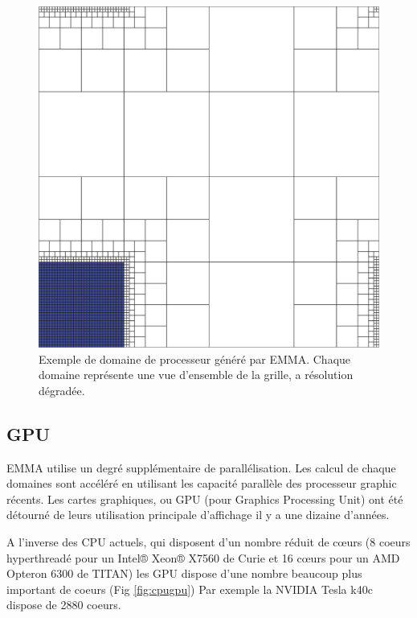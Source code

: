 \begin{figure}[bth]
        \includegraphics[width=.95\linewidth]{img/02/secteur.png} 
        \caption{Exemple de domaine de processeur généré par EMMA. 
        Chaque domaine représente une vue d'ensemble de la grille, a résolution dégradée.
}
 		\label{fig:hilbert2}
\end{figure}







\subsection{GPU}

EMMA utilise un degré supplémentaire de parallélisation.
Les calcul de chaque domaines sont accéléré en utilisant les capacité parallèle des processeur graphic récents.
Les cartes graphiques, ou GPU (pour Graphics Processing Unit) ont été détourné de leurs utilisation principale d'affichage il y a une dizaine d'années.

A l'inverse des CPU actuels, qui disposent d'un nombre réduit de cœurs (8 coeurs hyperthreadé pour un Intel® Xeon® X7560 de Curie et 16 cœurs pour un AMD Opteron 6300 de TITAN) les GPU dispose d'une nombre beaucoup plus important de coeurs (Fig \ref{fig:cpugpu})
Par exemple la NVIDIA Tesla k40c dispose de 2880 coeurs.

